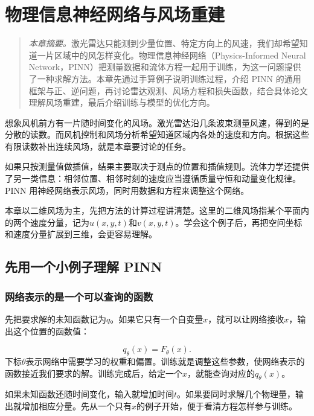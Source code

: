 \chapter{物理信息神经网络与风场重建}
\label{chap:pinn}
\begin{quote}\small
\textit{本章摘要。}激光雷达只能测到少量位置、特定方向上的风速，我们却希望知道一片区域中的风怎样变化。物理信息神经网络（Physics-Informed Neural Network，PINN）把测量数据和流体方程一起用于训练，为这一问题提供了一种求解方法。本章先通过手算例子说明训练过程，介绍 PINN 的通用框架与正、逆问题，再讨论雷达观测、风场方程和损失函数，结合具体论文理解风场重建，最后介绍训练与模型的优化方向。
\end{quote}

想象风机前方有一片随时间变化的风场。激光雷达沿几条波束测量风速，得到的是分散的读数。而风机控制和风场分析希望知道区域内各处的速度和方向。根据这些有限读数补出连续风场，就是本章要讨论的任务。

如果只按测量值做插值，结果主要取决于测点的位置和插值规则。流体力学还提供了另一类信息：相邻位置、相邻时刻的速度应当遵循质量守恒和动量变化规律。PINN 用神经网络表示风场，同时用数据和方程来调整这个网络\cite{karniadakis2021physics, raissi2019pinn}。

本章以二维风场为主，先把方法的计算过程讲清楚。这里的二维风场指某个平面内的两个速度分量，记为$u(x,y,t)$和$v(x,y,t)$。学会这个例子后，再把空间坐标和速度分量扩展到三维，会更容易理解。

\section{先用一个小例子理解 PINN}
\label{sec:pinn-formulation}

\subsection{网络表示的是一个可以查询的函数}
先把要求解的未知函数记为$q$。如果它只有一个自变量$x$，就可以让网络接收$x$，输出这个位置的函数值：

\begin{equation}
 q_\theta(x)=F_\theta(x).
 \label{eq:pinn-generic-network}
\end{equation}
下标$\theta$表示网络中需要学习的权重和偏置。训练就是调整这些参数，使网络表示的函数接近我们要求的解。训练完成后，给定一个$x$，就能查询对应的$q_\theta(x)$。

如果未知函数还随时间变化，输入就增加时间$t$。如果要同时求解几个物理量，输出就增加相应分量。先从一个只有$x$的例子开始，便于看清方程怎样参与训练。

